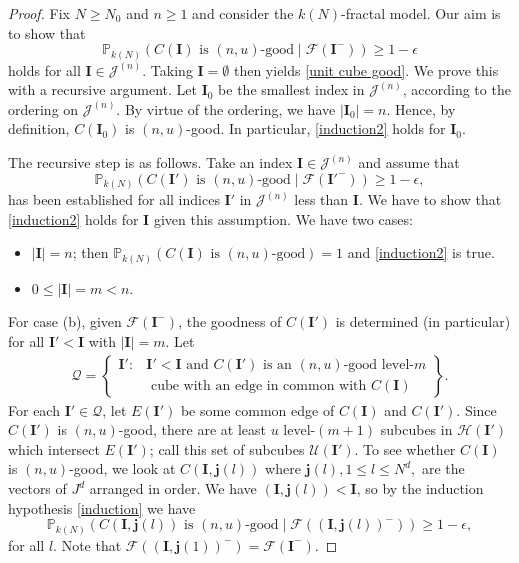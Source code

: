 \documentclass[11pt,a4paper]{article}
\newcommand{\Ib}{\ensuremath{\mathbf{I}}}
\newcommand{\Ij}{\ensuremath{\mathbf{j}}}
\newcommand{\IP}{\ensuremath{\mathbb{P}}}
\newcommand{\JJ}{\ensuremath{\mathcal{J}}}
\newcommand{\FF}{\ensuremath{\mathcal{F}}}
\newcommand{\HH}{\ensuremath{\mathcal{H}}}
\newcommand{\QQ}{\ensuremath{\mathcal{Q}}}
\newcommand{\UU}{\ensuremath{\mathcal{U}}}
\theoremstyle{remark}
\begin{document}
\begin{proof}
Fix $N \geq N_0$ and $n\geq 1$ and consider the $k(N)$-fractal model. Our aim is to show that 
\begin{equation}\label{induction2}
 \IP_{k(N)}(C(\Ib) \text{ is } (n,u)\text{-good} \mid \FF(\Ib^-)) \geq 1 -\epsilon
\end{equation}
holds for all $\Ib \in \JJ^{(n)}$. Taking $\Ib=\emptyset$ then yields \eqref{unit cube good}. We prove this with a recursive argument. Let $\Ib_0$ be the smallest index in $\JJ^{(n)}$, according to the ordering on $\JJ^{(n)}$. By virtue of the ordering, we have $|\Ib_0| = n$. Hence, by definition, $C(\Ib_0)$ is $(n,u)$-good. In particular, \eqref{induction2} holds for $\Ib_0$.


The recursive step is as follows. Take an index $\Ib \in \JJ^{(n)}$ and assume that  
\begin{equation}\label{induction}
 \IP_{k(N)}(C(\Ib') \text{ is } (n,u)\text{-good} \mid \FF(\Ib'^-)) \geq 1 -\epsilon,
\end{equation}
has been established for all indices $\Ib'$ in $\JJ^{(n)}$ less than $\Ib$. We have to show that \eqref{induction2} holds for $\Ib$ given this assumption. We have two cases:
\begin{itemize}
 \item[(a)] $|\Ib| =n$; then $\IP_{k(N)}(C(\Ib) \text{ is } (n,u)\text{-good}) =1$ and \eqref{induction2} is true.
\item[(b)] $0 \leq |\Ib| = m < n$.
\end{itemize}


For case (b), given $\FF(\Ib^-)$, the goodness of $C(\Ib')$ is determined (in particular) for all $\Ib' < \Ib$ with $|\Ib|=m$. Let
\begin{eqnarray*}
 \QQ=\left\{\begin{array}{cc} \Ib': & \Ib'<\Ib \text{ and } C(\Ib') \text{ is an } (n,u)\text{-good level-}m \\
& \text{ cube with an edge in common with }C(\Ib)           
          \end{array}\right\}.
\end{eqnarray*}
For each $\Ib' \in \QQ$, let $E(\Ib')$ be some common edge of $C(\Ib)$ and $C(\Ib')$. Since $C(\Ib')$ is $(n,u)$-good, there are at least $u$ level-$(m+1)$ subcubes in $\HH(\Ib')$ which intersect $E(\Ib')$; call this set of subcubes $\UU(\Ib')$. To see whether $C(\Ib)$ is $(n,u)$-good, we look at $C(\Ib,\Ij(l))$ where $\Ij(l), 1 \leq l \leq N^d,$ are the vectors of $J^d$ arranged in order. We have $(\Ib,\Ij(l)) < \Ib$, so by the induction hypothesis \eqref{induction} we have
\begin{equation}\label{induction sub}
 \IP_{k(N)}(C(\Ib,\Ij(l)) \text{ is } (n,u)\text{-good} \mid \FF((\Ib,\Ij(l))^-)) \geq 1-\epsilon,
\end{equation}
for all $l$. Note that $\FF((\Ib,\Ij(1))^-) = \FF(\Ib^-)$.



\end{proof}
\end{document}
